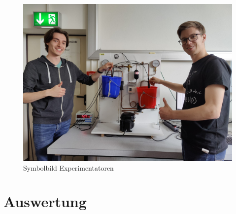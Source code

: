 \documentclass[english, ngerman]{scrartcl}
\begin{document}
%
\begin{figure}[H]
    \centering
    \begin{samepage}
        \includegraphics[width=0.6\linewidth]{fig/Spass1.jpeg}
        \caption[Symbolbild Experimentatoren]{Symbolbild Experimentatoren}
        \label{fig:umruehren}
    \end{samepage}
\end{figure}



\section{Auswertung}
\label{sec:auswertung}
\end{document}
